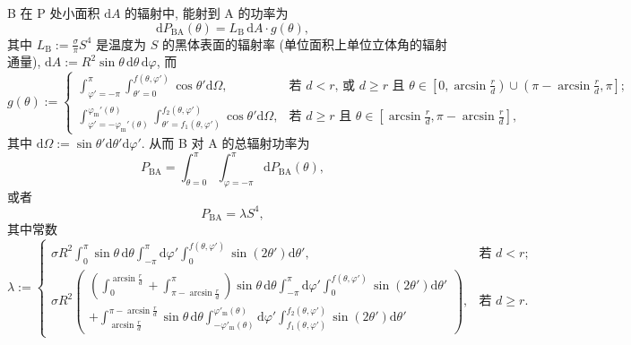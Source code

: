 \documentclass{article}
\begin{document}
B 在 $\mathrm P$ 处小面积 $\mathrm dA$ 的辐射中, 能射到 A 的功率为
\begin{equation}
	\mathrm dP_\mathrm{BA}\!\left(\theta\right)=
	L_\mathrm B\,\mathrm dA\cdot g\!\left(\theta\right),
\end{equation}
其中 $L_\mathrm B:=\frac\sigma\pi S^4$ 是温度为 $S$ 的黑体表面的辐射率 (单位面积上单位立体角的辐射通量),
$\mathrm dA:=R^2\sin\theta\,\mathrm d\theta\,\mathrm d\varphi$,
而
\begin{equation}
	g\!\left(\theta\right):=\begin{cases}
		\int_{\varphi'=-\pi}^{\pi}
		\int_{\theta'=0}^{f\!\left(\theta,\varphi'\right)}
		\cos\theta'\mathrm d\Omega,
		&\text{若 $d<r$, 或 $d\ge r$ 且
		$\theta\in\left[0,\arcsin\frac rd\right)\cup\left(\pi-\arcsin\frac rd,\pi\right]$;}\\
		\int_{\varphi'=-\varphi_\mathrm m'\!\left(\theta\right)}^{\varphi_\mathrm m'\!\left(\theta\right)}
		\int_{\theta'=f_1\!\left(\theta,\varphi'\right)}^{f_2\!\left(\theta,\varphi'\right)}
		\cos\theta'\mathrm d\Omega,
		&\text{若 $d\ge r$ 且 $\theta\in\left[\arcsin\frac rd,\pi-\arcsin\frac rd\right]$,}
	\end{cases}
\end{equation}
其中 $\mathrm d\Omega:=\sin\theta'\mathrm d\theta'\mathrm d\varphi'$.
从而 B 对 A 的总辐射功率为
\begin{equation}
	P_\mathrm{BA}=\int_{\theta=0}^\pi\int_{\varphi=-\pi}^{\pi}\mathrm dP_\mathrm{BA}\!\left(\theta\right),
\end{equation}
或者
\begin{equation}
	P_\mathrm{BA}=\lambda S^4,
\end{equation}
其中常数
\begin{equation}
	\lambda:=\begin{cases}
		\sigma R^2\int_0^\pi\sin\theta\,\mathrm d\theta
		\int_{-\pi}^\pi\mathrm d\varphi'
		\int_0^{f\!\left(\theta,\varphi'\right)}\sin\!\left(2\theta'\right)\mathrm d\theta',
		&\text{若 $d<r$;}\\
		\sigma R^2\left(
		\begin{matrix}\left(\int_0^{\arcsin\frac rd}+\int_{\pi-\arcsin\frac rd}^\pi\right)\sin\theta\,\mathrm d\theta
		\int_{-\pi}^\pi\mathrm d\varphi'
		\int_0^{f\!\left(\theta,\varphi'\right)}\sin\!\left(2\theta'\right)\mathrm d\theta'
		\\+\int_{\arcsin\frac rd}^{\pi-\arcsin\frac rd}\sin\theta\,\mathrm d\theta
		\int_{-\varphi'_\mathrm m\!\left(\theta\right)}^{\varphi'_\mathrm m\!\left(\theta\right)}\mathrm d\varphi'
		\int_{f_1\!\left(\theta,\varphi'\right)}^{f_2\!\left(\theta,\varphi'\right)}
		\sin\!\left(2\theta'\right)\mathrm d\theta'
		\end{matrix}\right),
		&\text{若 $d\ge r$.}
	\end{cases}
	\label{eq:黑体辐射参数}
\end{equation}
\end{document}
